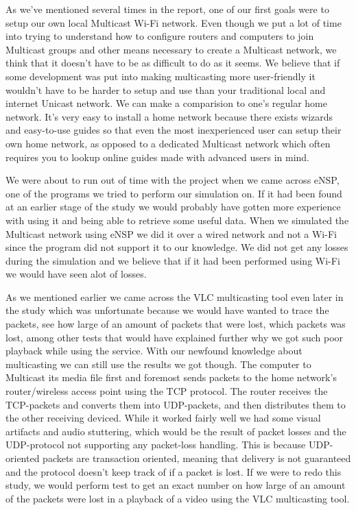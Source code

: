 \documentclass[9pt,a4paper]{acmproc}
\begin{document}
As we’ve mentioned several times in the report, one of our first goals were to setup our own local Multicast Wi-Fi network. Even though we put a lot of time into trying to understand how to configure routers and computers to join Multicast groups and other means necessary to create a Multicast network, we think that it doesn’t have to be as difficult to do as it seems. We believe that if some development was put into making multicasting more user-friendly it wouldn’t have to be harder to setup and use than your traditional local and internet Unicast network. We can make a comparision to one’s regular home network. It’s very easy to install a home network because there exists wizards and easy-to-use guides so that even the most inexperienced user can setup their own home network, as opposed to a dedicated Multicast network which often requires you to lookup online guides made with advanced users in mind. 

We were about to run out of time with the project when we came across eNSP, one of the programs we tried to perform our simulation on. If it had been found at an earlier stage of the study we would probably have gotten more experience with using it and being able to retrieve some useful data. When we simulated the Multicast network using eNSP we did it over a wired network and not a Wi-Fi since the program did not support it to our knowledge. We did not get any losses during the simulation and we believe that if it had been performed using Wi-Fi we would have seen alot of losses.

As we mentioned earlier we came across the VLC multicasting tool even later in the study which was unfortunate because we would have wanted to trace the packets, see how large of an amount of packets that were lost, which packets was lost, among other tests that would have explained further why we got such poor playback while using the service. With our newfound knowledge about multicasting we can still use the results we got though. The computer to Multicast its media file first and foremost sends packets to the home network’s router/wireless access point using the TCP protocol. The router receives the TCP-packets and converts them into UDP-packets, and then distributes them to the other receiving deviced. While it worked fairly well we had some visual artifacts and audio stuttering, which would be the result of packet losses and the UDP-protocol not supporting any packet-loss handling. This is because UDP-oriented packets are transaction oriented, meaning that delivery is not guaranteed and the protocol doesn’t keep track of if a packet is lost. If we were to redo this study, we would perform test to get an exact number on how large of an amount of the packets were lost in a playback of a video using the VLC multicasting tool.
\end{document}
